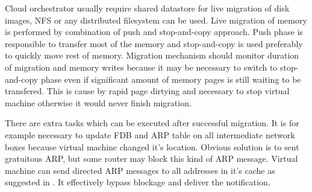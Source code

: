 Cloud orchestrator usually require shared datastore for live migration of disk images, \Ac{NFS} or any distributed filesystem can be used. Live migration of 
memory is performed by combination of push and stop-and-copy approach. Push phase is responsible to transfer most of the memory and stop-and-copy is used preferably to quickly move rest of memory. Migration mechanism should monitor duration of migration and memory writes because it may be necessary to switch to stop-and-copy phase even if significant amount of memory pages is still waiting to be transfered. This is cause by rapid page dirtying and necessary to stop virtual machine otherwise it would never finish migration.


There are extra tasks which can be executed after successful migration. It is for example necessary to update \Ac{FDB} and \Ac{ARP} table on all intermediate network boxes because virtual machine changed it's location. Obvious solution is to sent gratuitous \Ac{ARP}, but some router may block this kind of \Ac{ARP} message. Virtual machine can send directed \Ac{ARP} messages to all addresses in it's cache as suggested in \cite{live-migration-of-vms}. It effectively bypass blockage and deliver the notification.
